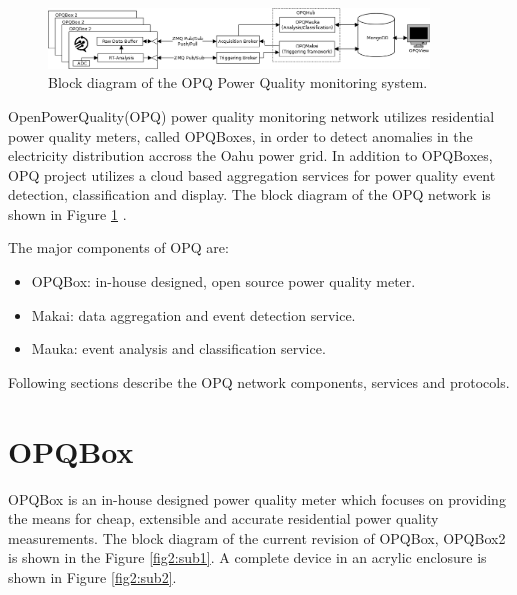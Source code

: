 \begin{figure}[h]
  \begin{center}
  \includegraphics[width=0.9\textwidth]{img/system-diagram.png}
  \end{center}
  \caption{Block diagram of the OPQ Power Quality monitoring system.}
  \label{fig:1}
\end{figure}

OpenPowerQuality(OPQ) power quality monitoring network utilizes residential power quality meters, called OPQBoxes, in order to detect anomalies in the electricity distribution accross the Oahu power grid. In addition to OPQBoxes, OPQ project utilizes a cloud based aggregation services for power quality event detection, classification and display. The block diagram of the OPQ network is shown in Figure \ref{fig:1} .

The major components of OPQ are:
\begin {itemize}
	\item OPQBox: in-house designed, open source power quality meter.
	\item Makai: data aggregation and event detection service.
	\item Mauka: event analysis and classification service.
\end {itemize}

Following sections describe the OPQ network components, services and protocols.

\section{OPQBox}

OPQBox is an in-house designed power quality meter which focuses on providing the means for cheap, extensible and accurate residential power quality measurements. The block diagram of the current revision of OPQBox, OPQBox2 is shown in the Figure \ref{fig2:sub1}. A complete device in an acrylic enclosure is shown in Figure \ref{fig2:sub2}.


